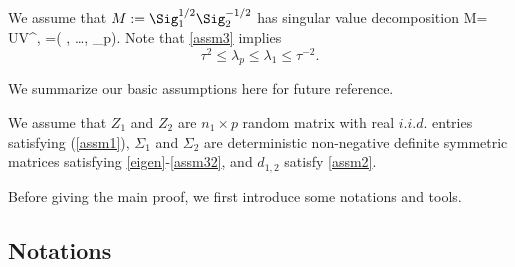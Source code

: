 We assume that $M:=\Sig_1^{1/2} \Sig_2^{-1/2}$ has singular value decomposition
\be\label{eigen2}
M= U\Lambda V^\top, \quad \Lambda=( \sigma, \ldots, \sigma_p).
\ee
Note that \eqref{assm3} implies  
\begin{equation}\label{assm32}
\tau^2 \le \lambda_p \le \lambda_1 \le \tau^{-2}. %
\end{equation}


We summarize our basic assumptions here for future reference.
\begin{assumption}\label{assm_big1}
We assume that $Z_1$ and $Z_2$ are $n_1\times p$ random matrix with real $i.i.d.$ entries satisfying (\ref{assm1}), $\Sigma_1$ and $\Sigma_2$ are deterministic non-negative definite symmetric matrices satisfying \eqref{eigen}-\eqref{assm32}, and $d_{1,2}$ satisfy \eqref{assm2}.
\end{assumption}


Before giving the main proof, we first introduce some notations and tools. 


\subsection{Notations}

%



